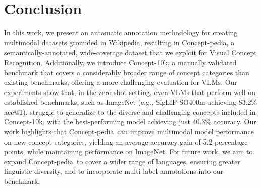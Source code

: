 \documentclass[11pt]{article}
\newcommand{\resource}{Concept-pedia}
\newcommand{\benchmark}{Concept-10k}
\begin{document}
\section{Conclusion}
In this work, we present an automatic annotation methodology for creating multimodal datasets grounded in Wikipedia, resulting in \resource, a semantically-annotated, wide-coverage dataset that we exploit for Visual Concept Recognition.
Additionally, we introduce \benchmark, a manually validated benchmark that covers a considerably broader range of concept categories than existing benchmarks, offering a more challenging evaluation for VLMs.
Our experiments show that, in the zero-shot setting, even VLMs that perform well on established benchmarks, such as ImageNet (e.g., SigLIP-SO400m achieving 83.2\% acc@1), struggle to generalize to the diverse and challenging concepts included in \benchmark, with the best-performing model achieving just 40.3\% accuracy.
Our work highlights that \resource~can improve multimodal model performance on new concept categories, yielding an average accuracy gain of 5.2 percentage points, while maintaining performance on ImageNet.
For future work, we aim to expand \resource~to cover a wider range of languages, ensuring greater linguistic diversity, and to incorporate multi-label annotations into our benchmark.

\end{document}
